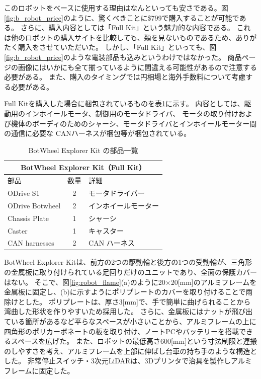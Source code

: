 \documentclass[twocolumn,9pt]{jsproceedings}
\begin{document}
このロボットをベースに使用する理由はなんといっても安さである。図\ref{fig:b_robot_price}のように、驚くべきことに\$799で購入することが可能である。
さらに、購入内容としては「Full Kit」という魅力的な内容である。
これは他のロボットの購入サイトを比較しても、類を見ないものであるため、ありがたく購入をさせていただいた。
しかし、「Full Kit」といっても、図\ref{fig:b_robot_price}のような電装部品も込みというわけではなかった。
商品ページの画像にはいかにも全て揃っているように間違える可能性があるので注意する必要がある。
また、購入のタイミングでは円相場と海外手数料について考慮する必要がある。

Full Kitを購入した場合に梱包されているものを表\ref{tab:botwheel_kit}に示す。
内容としては、駆動用のインホイールモータ、制御用のモータドライバ、
モータの取り付けおよび機体のボーディのためのシャーシ、モータドライバとインホイールモーター間の通信に必要な
CANハーネスが梱包等が梱包されている。
\begin{table}[h]
  \centering
  \begin{tabular}{|l|c|l|}
      \hline
      \multicolumn{3}{|c|}{\textbf{BotWheel Explorer Kit（Full Kit）}} \\
      \hline
      部品 & 数量 & 詳細 \\
      \hline
      ODrive S1 & 2 & モータドライバー \\
      ODrive Botwheel & 2 & インホイールモーター \\
      Chassis Plate & 1 & シャーシ \\
      Caster & 1 & キャスター \\
      CAN harnesses & 2 & CAN ハーネス \\
      \hline
  \end{tabular}
  \caption{BotWheel Explorer Kit の部品一覧}
  \label{tab:botwheel_kit}
\end{table}


BotWheel Explorer Kitは、前方の2つの駆動輪と後方の1つの受動輪が、三角形の金属板に取り付けられている足回りだけのユニットであり、全面の保護カバーはない。
そこで、図\ref{fig:robot_flame}(a)のように20×20[mm]のアルミフレームを金属板に固定し、(b)に示すようにポリプレートのカバーを取り付けることで雨除けとした。
ポリプレートは、厚さ3[mm]で、手で簡単に曲げられることから湾曲した形状を作りやすいため採用した。
さらに、金属板にはナットが飛び出ている箇所があるなど平らなスペースが小さいことから、アルミフレームの上に四角形のポリカーボネート\cite{PE960_1}の板を取り付け、ノートPCやバッテリーを搭載できるスペースを広げた。
また、ロボットの最低高さ600[mm]という寸法制限と運搬のしやすさを考え、アルミフレームを上部に伸ばし台車の持ち手のような構造とした。
非常停止スイッチ・3次元LiDARは、3Dプリンタで治具を製作しアルミフレームに固定した。
\end{document}
